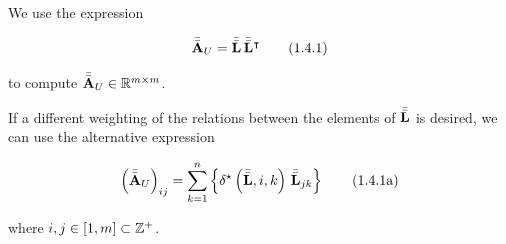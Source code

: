 \documentclass[../../ClusteringConnectionsMAIN.tex]{subfiles}
\begin{document}
\begin{flushleft}
\begin{large}

We use the expression

\begin{align}
\bar{\bar{\mathbf{A}}}_U = \bar{\bar{\mathbf{L}}} \, \bar{\bar{\mathbf{L}}}^\intercal \tag{1.4.1}
\end{align}

to compute $\bar{\bar{\mathbf{A}}}_U \in \mathbb{R}^{m \times m}$. \newline

If a different weighting of the relations between the elements of $\bar{\bar{\mathbf{L}}}$ is desired, we can use the alternative expression

\begin{align}
\left( \bar{\bar{\mathbf{A}}}_U \right)_{ij} = \sum_{k = 1}^n \left\{ \delta^\star \left( \bar{\bar{\mathbf{L}}}, i, k \right) \, \bar{\bar{\mathbf{L}}}_{jk} \right\} \tag{1.4.1a}
\end{align}

where $i, j \in \left[ 1, m \right] \subset \mathbb{Z}^+$.







































\end{large}
\end{flushleft}
\end{document}
